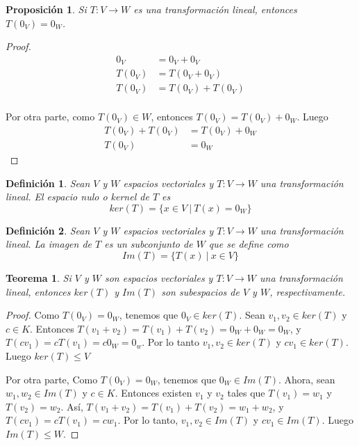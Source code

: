 \documentclass{book}
\newtheorem{theorem}{Teorema}
\newtheorem{proposition}{Proposición}
\newtheorem{definition}{Definición}
\begin{document}
\begin{proposition}

Si $T:V\rightarrow W$ es una transformación lineal, entonces $T(0_V)=0_W$.

\end{proposition}

\begin{proof}
\[ 
\begin{split}
0_V &=0_V+0_V \\
T(0_V) &= T(0_V+0_V) \\
T(0_V) &= T(0_V)+T(0_V) \\
\end{split}
\]

Por otra parte, como $T(0_V)\in W$, entonces $T(0_V)=T(0_V)+0_W$. Luego
\[ 
\begin{split}
T(0_V)+T(0_V) &= T(0_V)+0_W \\
T(0_V) &= 0_W
\end{split}
\]

\end{proof} 

\begin{definition}
Sean $V$ y $W$ espacios vectoriales y $T:V\rightarrow W$ una transformación lineal. El espacio nulo o kernel de $T$ es  
\[ker(T)=\{x\in V \ |\ T(x)=0_W \}\]
\end{definition}

\begin{definition}
Sean $V$ y $W$ espacios vectoriales y $T:V\rightarrow W$ una transformación lineal. La imagen de $T$ es un subconjunto de $W$ que se define como 
\[Im(T)=\{T(x) \ |\ x\in V \}\]
\end{definition}

\begin{theorem}
Si $V$ y $W$ son espacios vectoriales y $T:V\rightarrow W$ una transformación lineal, entonces $ker(T)$ y $Im(T)$ son subespacios de $V$ y $W$, respectivamente.
\end{theorem}

\begin{proof}
Como $T(0_V)=0_W$, tenemos que $0_V\in ker(T)$. Sean $v_1,v_2 \in ker(T)$ y $c\in K$. Entonces $T(v_1+v_2)=T(v_1)+T(v_2)=0_W+0_W=0_W$, y $T(cv_1)=cT(v_1)=c0_W=0_w$. Por lo tanto $v_1,v_2\in ker(T)$ y $cv_1\in ker(T)$. Luego $ker(T)\leq V$

Por otra parte, Como $T(0_V)=0_W$, tenemos que $0_W\in Im(T)$. Ahora, sean $w_1,w_2 \in Im(T)$ y $c\in K$. Entonces existen $v_1$ y $v_2$ tales que $T(v_1)=w_1$ y $T(v_2)=w_2$. Así, $T(v_1+v_2)=T(v_1)+T(v_2)=w_1+w_2$, y $T(cv_1)=cT(v_1)=cw_1$. Por lo tanto, $v_1,v_2\in Im(T)$ y $cv_1\in Im(T)$. Luego $Im(T)\leq W$.
\end{proof}
\end{document}
